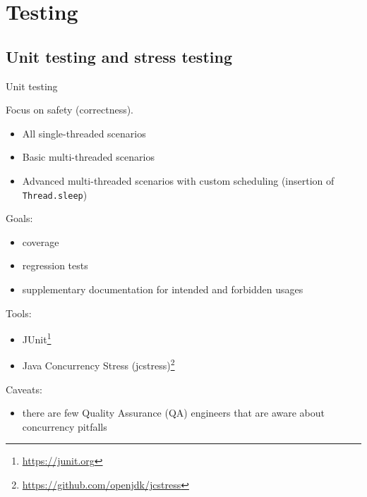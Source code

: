 \section{Testing}
\showTOC

\subsection{Unit testing and stress testing}

\begin{frame}{Unit testing}

Focus on safety (correctness).

\pause

\begin{itemize}
  \item All single-threaded scenarios
  \item Basic multi-threaded scenarios
  \item Advanced multi-threaded scenarios with custom scheduling (insertion of \texttt{Thread.sleep})
\end{itemize}

\pause
Goals:
\begin{itemize}
  \item coverage
  \item regression tests
  \item supplementary documentation for intended and forbidden usages
\end{itemize}

\pause
Tools:
\begin{itemize}
  \item JUnit\footnote<4->{\tiny\url{https://junit.org}} 
  \item Java Concurrency Stress (jcstress)\footnote<4->{\tiny\url{https://github.com/openjdk/jcstress}}
\end{itemize}

\pause
Caveats: 
\begin{itemize}
  \item there are few Quality Assurance (QA) engineers that are aware about concurrency pitfalls
\end{itemize}

\end{frame}


